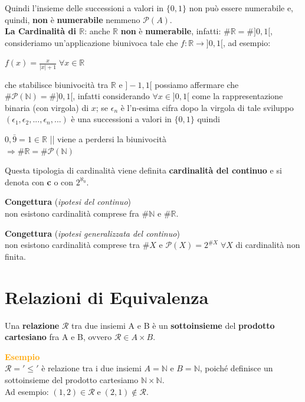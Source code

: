 Quindi l'insieme delle successioni a valori in $\{0, 1\}$  non può essere numerabile e, quindi, \textbf{non} è \textbf{numerabile} nemmeno $\mathcal{P}(A)$. \\ \newline
\textbf{La Cardinalità di $\mathbb{R}$}: anche $\mathbb{R}$ \textbf{non} è \textbf{numerabile}, infatti: $\#\mathbb{R} = \# ]0,1[$, consideriamo un'applicazione biunivoca tale che $f : \mathbb{R} \rightarrow ]0,1[$, ad esempio:
\begin{center}
    $f(x) = \frac{x}{ |x| + 1 } \; \forall x \in \mathbb{R}$
\end{center}
che stabilisce biunivocità tra $\mathbb{R}$ e $] -1, 1[$ possiamo affermare che $\#\mathcal{P}(\mathbb{N}) = \#]0,1[$, infatti considerando $\forall x \in ]0, 1[$ come la rappresentazione binaria (con virgola) di $x$; se $\epsilon_n$ è l'n-esima cifra dopo la virgola di tale sviluppo $(\epsilon_1, \epsilon_2, ..., \epsilon_n, ...)$ è una successioni a valori in $\{0, 1\}$ quindi
\begin{center}
    $0,\bar{9} = 1 \in \mathbb{R}$ || viene a perdersi la biunivocità \\
    $\Rightarrow \#\mathbb{R} = \# \mathcal{P}(\mathbb{N})$
\end{center}
Questa tipologia di cardinalità viene definita \textbf{cardinalità del continuo} e si denota con \textbf{c} o con $2^{\aleph_0}$.
\begin{boxA}
    \centering
    \textbf{Congettura} (\textit{ipotesi del continuo}) \\ 
    non esistono cardinalità comprese fra $\#\mathbb{N}$ e $\#\mathbb{R} $.
\end{boxA}
\begin{boxA}
    \centering
    \textbf{Congettura} (\textit{ipotesi generalizzata del continuo}) \\
    non esistono cardinalità comprese tra $\#X$ e $\mathcal{P}(X) = 2^{\#X} \; \forall X$ di cardinalità non finita.
\end{boxA}

\section{Relazioni di Equivalenza}
Una \textbf{relazione} $\mathcal{R}$ tra due insiemi A e B è un \textbf{sottoinsieme} del \textbf{prodotto cartesiano} fra A e B, ovvero $\mathcal{R} \in A \times B$.
\begin{boxA}
    \textcolor{orange}{\textbf{Esempio}} \\
    $\mathcal{R} = '\leq'$ è relazione tra i due insiemi $A = \mathbb{N}$ e $B = \mathbb{N}$, poiché definisce un sottoinsieme del prodotto cartesiamo $\mathbb{N} \times \mathbb{N}$. \\
    Ad esempio: $(1, 2) \in \mathcal{R} \; \text{e} \; (2, 1) \notin \mathcal{R}$.
\end{boxA}

